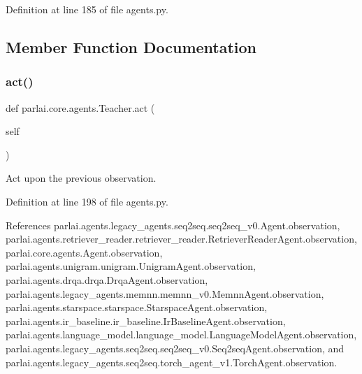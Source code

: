 Definition at line 185 of file agents.\+py.



\subsection{Member Function Documentation}
\mbox{\label{classparlai_1_1core_1_1agents_1_1Teacher_a3f4cbdfdddddb8776ab665f5f7ee63d6}} 
\subsubsection{\texorpdfstring{act()}{act()}}
{\footnotesize\ttfamily def parlai.\+core.\+agents.\+Teacher.\+act (\begin{DoxyParamCaption}\item[{}]{self }\end{DoxyParamCaption})}

\begin{DoxyVerb}Act upon the previous observation.\end{DoxyVerb}
 

Definition at line 198 of file agents.\+py.



References parlai.\+agents.\+legacy\+\_\+agents.\+seq2seq.\+seq2seq\+\_\+v0.\+Agent.\+observation, parlai.\+agents.\+retriever\+\_\+reader.\+retriever\+\_\+reader.\+Retriever\+Reader\+Agent.\+observation, parlai.\+core.\+agents.\+Agent.\+observation, parlai.\+agents.\+unigram.\+unigram.\+Unigram\+Agent.\+observation, parlai.\+agents.\+drqa.\+drqa.\+Drqa\+Agent.\+observation, parlai.\+agents.\+legacy\+\_\+agents.\+memnn.\+memnn\+\_\+v0.\+Memnn\+Agent.\+observation, parlai.\+agents.\+starspace.\+starspace.\+Starspace\+Agent.\+observation, parlai.\+agents.\+ir\+\_\+baseline.\+ir\+\_\+baseline.\+Ir\+Baseline\+Agent.\+observation, parlai.\+agents.\+language\+\_\+model.\+language\+\_\+model.\+Language\+Model\+Agent.\+observation, parlai.\+agents.\+legacy\+\_\+agents.\+seq2seq.\+seq2seq\+\_\+v0.\+Seq2seq\+Agent.\+observation, and parlai.\+agents.\+legacy\+\_\+agents.\+seq2seq.\+torch\+\_\+agent\+\_\+v1.\+Torch\+Agent.\+observation.

\mbox{\label{classparlai_1_1core_1_1agents_1_1Teacher_a4a2eda53b7b26f114ae3149b60f57845}} 
